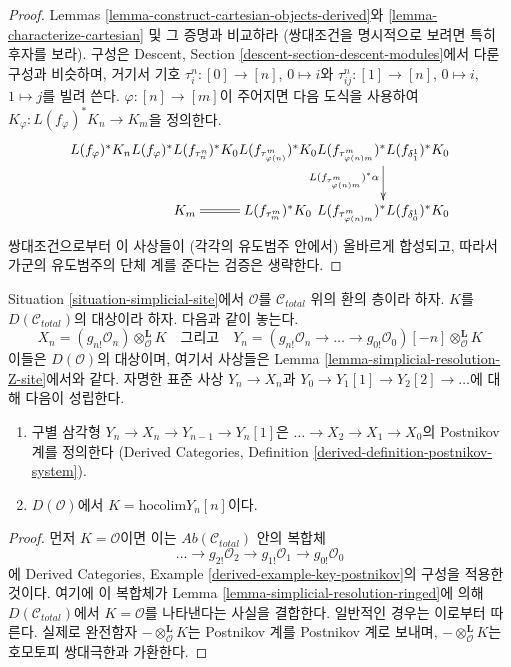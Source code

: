 \begin{proof}
Lemmas \ref{lemma-construct-cartesian-objects-derived}와
\ref{lemma-characterize-cartesian} 및 그 증명과 비교하라
(쌍대조건을 명시적으로 보려면 특히 후자를 보라).
구성은 Descent, Section \ref{descent-section-descent-modules}에서
다룬 구성과 비슷하며, 거기서 기호
$\tau^n_i : [0] \to [n]$, $0 \mapsto i$와
$\tau^n_{ij} : [1] \to [n]$, $0 \mapsto i$, $1 \mapsto j$를 빌려 쓴다.
$\varphi : [n] \to [m]$이 주어지면 다음 도식을 사용하여
$K_\varphi : L(f_\varphi)^*K_n \to K_m$을 정의한다.
$$
\xymatrix@C=-0.6em{
L(f_\varphi)^*K_n \ar@{=}[r] &
L(f_\varphi)^* L(f_{\tau^n_n})^*K_0 \ar@{=}[r] &
L(f_{\tau^m_{\varphi(n)}})^*K_0 \ar@{=}[r] &
L(f_{\tau^m_{\varphi(n)m}})^* L(f_{\delta^1_1})^*K_0
\ar[d]_{L(f_{\tau^m_{\varphi(n)m}})^*\alpha} \\
&
K_m \ar@{=}[r] &
L(f_{\tau^m_m})^*K_0 \ar@{=}[r] &
L(f_{\tau^m_{\varphi(n)m}})^* L(f_{\delta^1_0})^*K_0
}
$$
쌍대조건으로부터 이 사상들이 (각각의 유도범주 안에서)
올바르게 합성되고, 따라서 가군의 유도범주의 단체 계를 준다는
검증은 생략한다.
\end{proof}

\begin{lemma}
\label{lemma-modules-postnikov}
Situation \ref{situation-simplicial-site}에서
$\mathcal{O}$를 $\mathcal{C}_{total}$ 위의 환의 층이라 하자.
$K$를 $D(\mathcal{C}_{total})$의 대상이라 하자. 다음과 같이 놓는다.
$$
X_n = (g_{n!}\mathcal{O}_n)
\otimes^\mathbf{L}_\mathcal{O} K
\quad\text{그리고}\quad
Y_n =
(g_{n!}\mathcal{O}_n \to \ldots \to g_{0!}\mathcal{O}_0)[-n]
\otimes^\mathbf{L}_\mathcal{O} K
$$
이들은 $D(\mathcal{O})$의 대상이며, 여기서 사상들은
Lemma \ref{lemma-simplicial-resolution-Z-site}에서와 같다.
자명한 표준 사상 $Y_n \to X_n$과
$Y_0 \to Y_1[1] \to Y_2[2] \to \ldots$에 대해 다음이 성립한다.
\begin{enumerate}
\item 구별 삼각형 $Y_n \to X_n \to Y_{n - 1} \to Y_n[1]$은
$\ldots \to X_2 \to X_1 \to X_0$의 Postnikov 계를 정의한다
(Derived Categories, Definition
\ref{derived-definition-postnikov-system}).
\item $D(\mathcal{O})$에서 $K = \text{hocolim} Y_n[n]$이다.
\end{enumerate}
\end{lemma}

\begin{proof}
먼저 $K = \mathcal{O}$이면 이는
$\textit{Ab}(\mathcal{C}_{total})$ 안의 복합체
$$
\ldots \to
g_{2!}\mathcal{O}_2 \to
g_{1!}\mathcal{O}_1 \to
g_{0!}\mathcal{O}_0
$$
에 Derived Categories, Example
\ref{derived-example-key-postnikov}의 구성을 적용한 것이다.
여기에 이 복합체가 Lemma
\ref{lemma-simplicial-resolution-ringed}에 의해
$D(\mathcal{C}_{total})$에서 $K = \mathcal{O}$를 나타낸다는 사실을 결합한다.
일반적인 경우는 이로부터 따른다. 실제로 완전함자
$- \otimes^\mathbf{L}_\mathcal{O} K$는 Postnikov 계를
Postnikov 계로 보내며,
$- \otimes^\mathbf{L}_\mathcal{O} K$는 호모토피 쌍대극한과 가환한다.
\end{proof}


